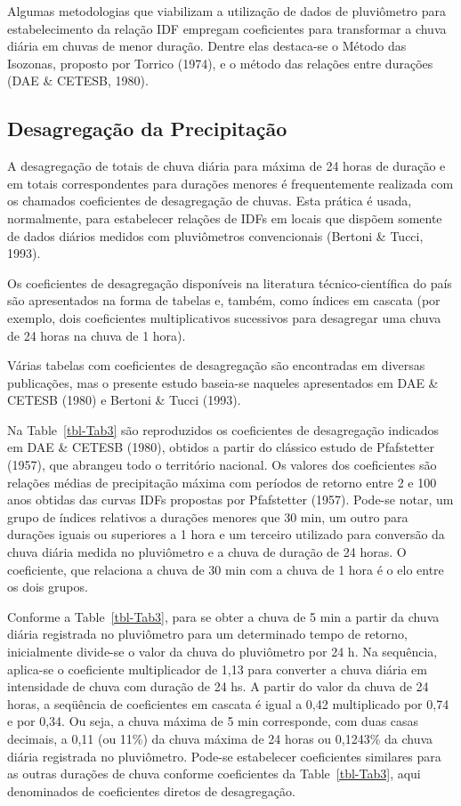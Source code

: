 \documentclass[
]{agujournal2019}
\begin{document}
Algumas metodologias que viabilizam a utilização de dados de pluviômetro
para estabelecimento da relação IDF empregam coeficientes para
transformar a chuva diária em chuvas de menor duração. Dentre elas
destaca-se o Método das Isozonas, proposto por Torrico (1974), e o
método das relações entre durações (DAE \& CETESB, 1980).

\subsection{Desagregação da
Precipitação}\label{desagregauxe7uxe3o-da-precipitauxe7uxe3o}

A desagregação de totais de chuva diária para máxima de 24 horas de
duração e em totais correspondentes para durações menores é
frequentemente realizada com os chamados coeficientes de desagregação de
chuvas. Esta prática é usada, normalmente, para estabelecer relações de
IDFs em locais que dispõem somente de dados diários medidos com
pluviômetros convencionais (Bertoni \& Tucci, 1993).

Os coeficientes de desagregação disponíveis na literatura
técnico-científica do país são apresentados na forma de tabelas e,
também, como índices em cascata (por exemplo, dois coeficientes
multiplicativos sucessivos para desagregar uma chuva de 24 horas na
chuva de 1 hora).

Várias tabelas com coeficientes de desagregação são encontradas em
diversas publicações, mas o presente estudo baseia-se naqueles
apresentados em DAE \& CETESB (1980) e Bertoni \& Tucci (1993).

Na Table~\ref{tbl-Tab3} são reproduzidos os coeficientes de desagregação
indicados em DAE \& CETESB (1980), obtidos a partir do clássico estudo
de Pfafstetter (1957), que abrangeu todo o território nacional. Os
valores dos coeficientes são relações médias de precipitação máxima com
períodos de retorno entre 2 e 100 anos obtidas das curvas IDFs propostas
por Pfafstetter (1957). Pode-se notar, um grupo de índices relativos a
durações menores que 30 min, um outro para durações iguais ou superiores
a 1 hora e um terceiro utilizado para conversão da chuva diária medida
no pluviômetro e a chuva de duração de 24 horas. O coeficiente, que
relaciona a chuva de 30 min com a chuva de 1 hora é o elo entre os dois
grupos.

Conforme a Table~\ref{tbl-Tab3}, para se obter a chuva de 5 min a partir
da chuva diária registrada no pluviômetro para um determinado tempo de
retorno, inicialmente divide-se o valor da chuva do pluviômetro por 24
h. Na sequência, aplica-se o coeficiente multiplicador de 1,13 para
converter a chuva diária em intensidade de chuva com duração de 24 hs. A
partir do valor da chuva de 24 horas, a seqüência de coeficientes em
cascata é igual a 0,42 multiplicado por 0,74 e por 0,34. Ou seja, a
chuva máxima de 5 min corresponde, com duas casas decimais, a 0,11 (ou
11\%) da chuva máxima de 24 horas ou 0,1243\% da chuva diária registrada
no pluviômetro. Pode-se estabelecer coeficientes similares para as
outras durações de chuva conforme coeficientes da Table~\ref{tbl-Tab3},
aqui denominados de coeficientes diretos de desagregação.
\end{document}
